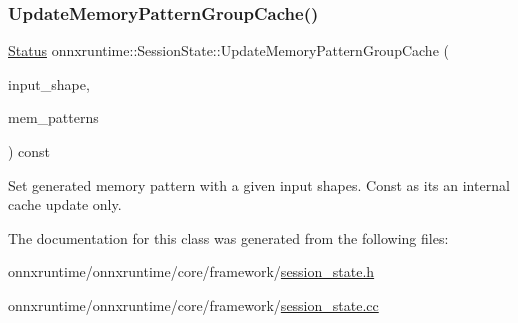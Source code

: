 \subsubsection{\texorpdfstring{Update\+Memory\+Pattern\+Group\+Cache()}{UpdateMemoryPatternGroupCache()}}
{\footnotesize\ttfamily \mbox{\hyperlink{classonnxruntime_1_1common_1_1Status}{Status}} onnxruntime\+::\+Session\+State\+::\+Update\+Memory\+Pattern\+Group\+Cache (\begin{DoxyParamCaption}\item[{const std\+::vector$<$ \mbox{\hyperlink{classonnxruntime_1_1TensorShape}{Tensor\+Shape}} $>$ \&}]{input\+\_\+shape,  }\item[{std\+::unique\+\_\+ptr$<$ \mbox{\hyperlink{structonnxruntime_1_1MemoryPatternGroup}{Memory\+Pattern\+Group}} $>$}]{mem\+\_\+patterns }\end{DoxyParamCaption}) const}

Set generated memory pattern with a given input shapes. Const as it\textquotesingle{}s an internal cache update only. 

The documentation for this class was generated from the following files\+:\begin{DoxyCompactItemize}
\item 
onnxruntime/onnxruntime/core/framework/\mbox{\hyperlink{session__state_8h}{session\+\_\+state.\+h}}\item 
onnxruntime/onnxruntime/core/framework/\mbox{\hyperlink{session__state_8cc}{session\+\_\+state.\+cc}}\end{DoxyCompactItemize}
